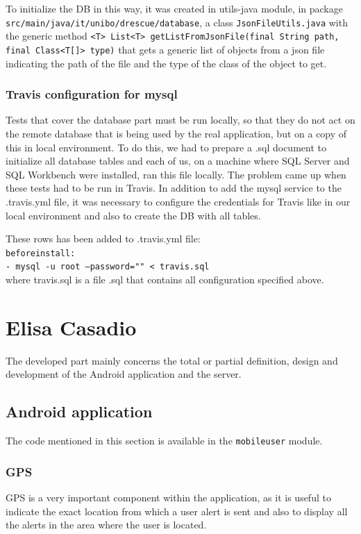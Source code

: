 \documentclass[a4paper,12pt]{report}
\begin{document}
To initialize the DB in this way, it was created in utils-java module, in package \texttt{src/main/java/it/unibo/drescue/database}, a class \texttt{JsonFileUtils.java} with the generic method \texttt{<T> List<T> getListFromJsonFile(final String path, \\final Class<T[]> type)} that gets a generic list of objects from a json file indicating the path of the file and the type of the class of the object to get.

\subsubsection{Travis configuration for mysql}
Tests that cover the database part must be run locally, so that they do not act on the remote database that is being used by the real application, but on a copy of this in local environment.
To do this, we had to prepare a .sql document to initialize all database tables and each of us, on a machine where SQL Server and SQL Workbench were installed, ran this file locally.
The problem came up when these tests had to be run in Travis. In addition to add the mysql service to the .travis.yml file, it was necessary to configure the credentials for Travis like in our local environment and also to create the DB with all tables.

These rows has been added to .travis.yml file:\\
\texttt{before}\textunderscore\texttt{install:}\\
\texttt{- mysql -u root --password="" < travis.sql}
\\where travis.sql is a file .sql that contains all configuration specified above.

\section{Elisa Casadio}
The developed part mainly concerns the total or partial definition, design and development of the Android application and the server.

\subsection{Android application}
The code mentioned in this section is available in the \texttt{mobileuser} module.
\subsubsection{GPS}
GPS is a very important component within the application, as it is useful to indicate the exact location from which a user alert is sent and also to display all the alerts in the area where the user is located.
\end{document}
